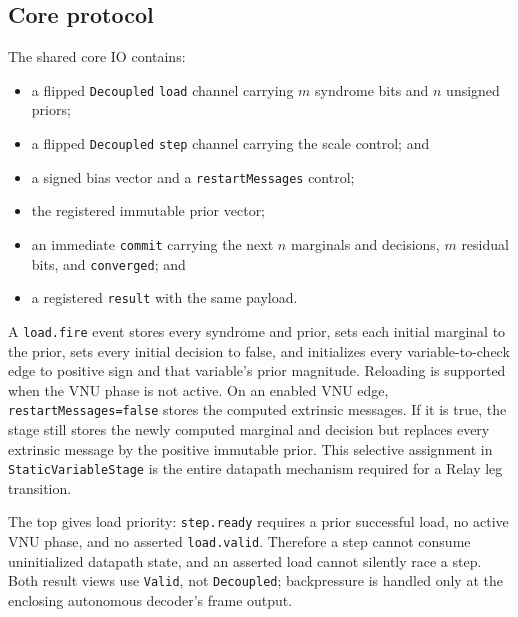 \documentclass[10pt,conference]{IEEEtran}
\begin{document}
\subsection{Core protocol}
The shared core IO contains:
\begin{itemize}
  \item a flipped \texttt{Decoupled} \texttt{load} channel carrying $m$
        syndrome bits and $n$ unsigned priors;
  \item a flipped \texttt{Decoupled} \texttt{step} channel carrying the scale
        control; and
  \item a signed bias vector and a \texttt{restartMessages} control;
  \item the registered immutable prior vector;
  \item an immediate \texttt{commit} carrying the next $n$ marginals and
        decisions, $m$ residual bits, and \texttt{converged}; and
  \item a registered \texttt{result} with the same payload.
\end{itemize}
A \texttt{load.fire} event stores every syndrome and prior, sets each initial
marginal to the prior, sets every initial decision to false, and initializes
every variable-to-check edge to positive sign and that variable's prior
magnitude.  Reloading is supported when the VNU phase is not active.  On an
enabled VNU edge, \texttt{restartMessages=false} stores the computed extrinsic
messages.  If it is true, the stage still stores the newly computed marginal
and decision but replaces every extrinsic message by the positive immutable
prior.  This selective assignment in \texttt{StaticVariableStage} is the entire
datapath mechanism required for a Relay leg transition.

The top gives load priority: \texttt{step.ready} requires a prior successful
load, no active VNU phase, and no asserted \texttt{load.valid}.  Therefore a
step cannot consume uninitialized datapath state, and an asserted load cannot
silently race a step.  Both result views use \texttt{Valid}, not
\texttt{Decoupled}; backpressure is handled only at the enclosing autonomous
decoder's frame output.
\end{document}
